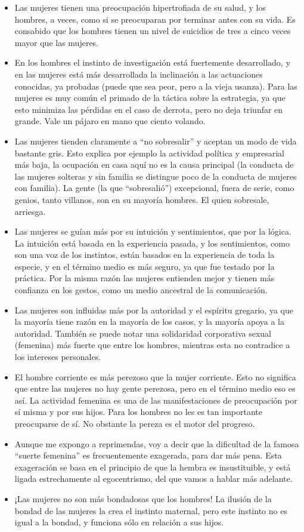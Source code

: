 \begin{itemize}
\tightlist
\item
  Las mujeres tienen una preocupación hipertrofiada de su salud, y los
  hombres, a veces, como si se preocuparan por terminar antes con su
  vida. Es consabido que los hombres tienen un nivel de suicidios de
  tres a cinco veces mayor que las mujeres.
\item
  En los hombres el instinto de investigación está fuertemente
  desarrollado, y en las mujeres está más desarrollada la inclinación a
  las actuaciones conocidas, ya probadas (puede que sea peor, pero a la
  vieja usanza). Para las mujeres es muy común el primado de la táctica
  sobre la estrategia, ya que esto minimiza las pérdidas en el caso de
  derrota, pero no deja triunfar en grande. Vale un pájaro en mano que
  ciento volando.
\item
  Las mujeres tienden claramente a ``no sobresalir'' y aceptan un modo
  de vida bastante gris. Esto explica por ejemplo la actividad política
  y empresarial más baja, la ocupación en casa aquí no es la causa
  principal (la conducta de las mujeres solteras y sin familia se
  distingue poco de la conducta de mujeres con familia). La gente (la
  que ``sobresalió'') excepcional, fuera de serie, como genios, tanto
  villanos, son en su mayoría hombres. El quien sobresale, arriesga.
\item
  Las mujeres se guían más por su intuición y sentimientos, que por la
  lógica. La intuición está basada en la experiencia pasada, y los
  sentimientos, como son una voz de los instintos, están basados en la
  experiencia de toda la especie, y en el término medio es más seguro,
  ya que fue testado por la práctica. Por la misma razón las mujeres
  entienden mejor y tienen más confianza en los gestos, como un medio
  ancestral de la comunicación.
\item
  Las mujeres son influidas más por la autoridad y el espíritu gregario,
  ya que la mayoría tiene razón en la mayoría de los casos, y la mayoría
  apoya a la autoridad. También se puede notar una solidaridad
  corporativa sexual (femenina) más fuerte que entre los hombres,
  mientras esta no contradice a los intereses personales.
\item
  El hombre corriente es más perezoso que la mujer corriente. Esto no
  significa que entre las mujeres no hay gente perezosa, pero en el
  término medio eso es así. La actividad femenina es una de las
  manifestaciones de preocupación por sí misma y por sus hijos. Para los
  hombres no les es tan importante preocuparse de sí. No obstante la
  pereza es el motor del progreso.
\item
  Aunque me expongo a reprimendas, voy a decir que la dificultad de la
  famosa ``suerte femenina'' es frecuentemente exagerada, para dar más
  pena. Esta exageración se basa en el principio de que la hembra es
  insustituible, y está ligada estrechamente al egocentrismo, del que
  vamos a hablar más adelante.
\item
  ¡Las mujeres no son más bondadosas que los hombres! La ilusión de la
  bondad de las mujeres la crea el instinto maternal, pero este instinto
  no es igual a la bondad, y funciona sólo en relación a sus hijos.
\end{itemize}

